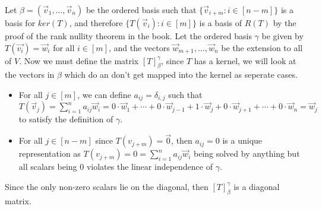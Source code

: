 \documentclass[12pt, letterpaper]{article}
\begin{document}
\begin{enumerate}
		Let $\beta = (\Vec{v}_1,\ldots,\Vec{v}_n)$ be the ordered basis such that $\{\Vec{v}_{i+m}: i\in [n-m]\}$ is a basis for $ker(T)$, and therefore $\{T(\Vec{v}_i) : i \in [m]\}$ is a basis of $R(T)$ by the proof of the rank nullity theorem in the book.  Let the ordered basis $\gamma$ be given by $T(\Vec{v_i}) = \Vec{w}_i$ for all $i \in [m]$, and the vectors $\Vec{w}_{m+1},\ldots,\Vec{w}_n$ be the extension to all of $V$.  Now we must define the matrix $[T]_{\beta}^\gamma$, since $T$ has a kernel, we will look at the vectors in $\beta$ which do an don't get mapped into the kernel as seperate cases.  
		\begin{itemize}
			\item For all $j \in [m]$, we can define $a_{ij} = \delta_{i,j}$ such that $T(\Vec{v}_j) = \sum_{i = 1}^n a_{ij}\Vec{w}_i = 0 \cdot \Vec{w}_1 + \cdots + 0 \cdot \Vec{w}_{j-1} + 1 \cdot \Vec{w}_j +  0 \cdot \Vec{w}_{j+1} + \cdots + 0 \cdot \Vec{w}_n = \Vec{w}_j$ to satisfy the definition of $\gamma$.
			\item For all $j \in [n-m]$ since $T(v_{j+m}) = \Vec{0}$, then $a_{ij} = 0$ is a unique representation as $T(v_{j+m})= 0 =\sum_{i=1}^n a_{ij}\Vec{w}_i$  being solved by anything but all scalars being $0$ violates the linear independence of $\gamma$. 
		\end{itemize}
		Since the only non-zero scalars lie on the diagonal, then $[T]_\beta^\gamma$ is a diagonal matrix.
		
		  
\end{enumerate}
\end{document}
